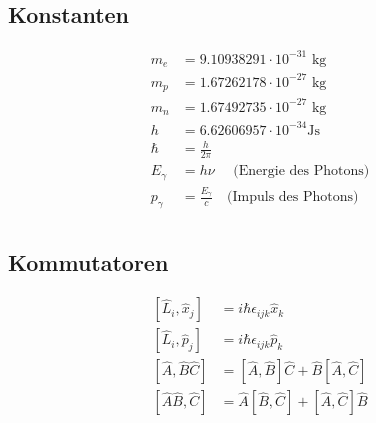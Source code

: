 \documentclass[landscape,8pt]{scrartcl}
\begin{document}
\begin{multicols}{3}
\subsection{Konstanten}
\begin{align*}
m_e &= 9.10938291\cdot 10^{-31} \text{ kg} \\
m_p &= 1.67262178\cdot 10^{-27} \text{ kg} \\
m_n &= 1.67492735\cdot 10^{-27} \text{ kg} \\
h &= 6.62606957\cdot 10^{-34} \text{Js} \\
\hbar &= \frac{h}{2\pi} \\
E_\gamma &= h \nu \quad\text{ (Energie des Photons)} \\
p_\gamma &= \frac{E_\gamma}{c} \quad \text{(Impuls des Photons)}\\
\end{align*}

\subsection{Kommutatoren}
\begin{align*}
\left[\hat L_i,\hat x_j\right] &= i\hbar \epsilon_{ijk}\hat x_k	\\
\left[\hat L_i,\hat p_j\right] &= i\hbar \epsilon_{ijk}\hat p_k	\\
\left[\hat A, \hat B \hat C\right]&= \left[ \hat A, \hat B \right] \hat C+ \hat B\left[ \hat A, \hat C \right] \\
\left[\hat A\hat B, \hat C\right]&= \hat A \left[ \hat B, \hat C \right] + \left[ \hat A, \hat C \right] \hat B\\
\end{align*}


\end{multicols}
\end{document}
